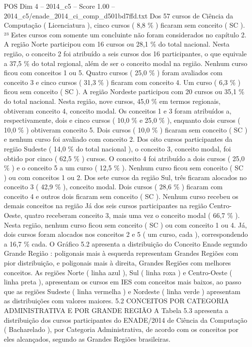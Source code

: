 \begin{textsample}{POS Dim 4 – 2014\_c5 – Score 1.00 – 2014\_c5/enade\_2014\_ci\_comp\_d501bd7ffd.txt}
Dos 57 cursos de Ciência da Computação ( Licenciatura ), cinco cursos ( 8,8 \% ) ficaram sem conceito ( SC ). ²³ Estes cursos com somente um concluinte não foram considerados no capítulo 2.
A região Norte participou com 16 cursos ou 28,1 \% do total nacional.
Nesta região, o conceito 2 foi atribuído a seis cursos dos 16 participantes, o que equivale a 37,5 \% do total regional, além de ser o conceito modal na região.
Nenhum curso ficou com conceitos 1 ou 5.
Quatro cursos ( 25,0 \% ) foram avaliados com conceito 3 e cinco cursos ( 31,3 \% ) ficaram com conceito 4.
Um curso ( 6,3 \% ) ficou sem conceito ( SC ).
A região Nordeste participou com 20 cursos ou 35,1 \% do total nacional.
Nesta região, nove cursos, 45,0 \% em termos regionais, obtiveram conceito 4, conceito modal.
Os conceitos 1 e 3 foram atribuídos a, respectivamente, dois e cinco cursos ( 10,0 \% e 25,0 \% ), enquanto dois cursos ( 10,0 \% ) obtiveram conceito 5.
Dois cursos ( 10,0 \% ) ficaram sem conceito ( SC ) e nenhum curso foi avaliado com conceito 2.
Dos oito cursos participantes da região Sudeste ( 14,0 \% do total nacional ), o conceito 3, conceito modal, foi obtido por cinco ( 62,5 \% ) cursos.
O conceito 4 foi atribuído a dois cursos ( 25,0 \% ) e o conceito 5 a um curso ( 12,5 \% ).
Nenhum curso ficou sem conceito ( SC ) ou com conceitos 1 ou 2.
Dos sete cursos da região Sul, três ficaram alocados no conceito 3 ( 42,9 \% ), conceito modal.
Dois cursos ( 28,6 \% ) ficaram com conceito 4 e outros dois ficaram sem conceito ( SC ).
Nenhum curso recebeu os demais conceitos na região Já dos seis cursos participantes na região Centro-Oeste, quatro receberam conceito 3, mais uma vez o conceito modal ( 66,7 \% ).
Nesta região, nenhum curso ficou sem conceito ( SC ) ou com conceito 1 ou 4.
Já, dois cursos foram alocados nos conceitos 2 e 5 ( um curso, cada ), correspondendo a 16,7 \% cada.
O Gráfico 5.2 apresenta a distribuição do Conceito Enade segundo Grande Região : poligonais mais à esquerda representam Grandes Regiões com pior distribuição, e poligonais mais à direita, Grandes Regiões com melhores conceitos.
As regiões Norte ( linha azul ), Sul ( linha roxa ) e Centro-Oeste ( linha preta ), apresentam os cursos em IES com conceitos mais baixos, ao passo que as regiões Sudeste ( linha vermelha ) e Nordeste ( linha verde ) apresentam as distribuições com valores maiores. 5.2 CONCEITOS POR CATEGORIA ADMINISTRATIVA E POR GRANDE REGIÃO A Tabela 5.3 apresenta a distribuição dos cursos participantes do ENADE/2014 de Ciência da Computação ( Bacharelado ), por Categoria Administrativa, de acordo com os conceitos por eles alcançados, segundo as Grandes Regiões brasileiras.

\end{textsample}
